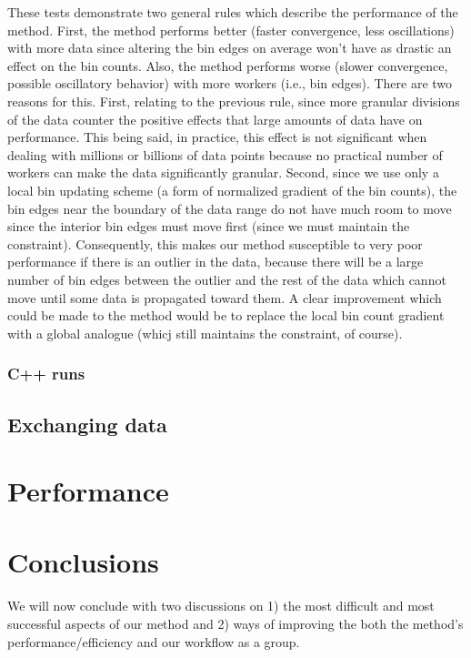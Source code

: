 \documentclass{article}
\begin{document}
These tests demonstrate two general rules which describe the performance of the method. First, the method performs better (faster convergence, less oscillations) with more data since altering the bin edges on average won't have as drastic an effect on the bin counts. Also, the method performs worse (slower convergence, possible oscillatory behavior) with more workers (i.e., bin edges). There are two reasons for this. First, relating to the previous rule, since more granular divisions of the data counter the positive effects that large amounts of data have on performance. This being said, in practice, this effect is not significant when dealing with millions or billions of data points because no practical number of workers can make the data significantly granular. Second, since we use only a local bin updating scheme (a form of normalized gradient of the bin counts), the bin edges near the boundary of the data range do not have much room to move since the interior bin edges must move first (since we must maintain the constraint). Consequently, this makes our method susceptible to very poor performance if there is an outlier in the data, because there will be a large number of bin edges between the outlier and the rest of the data which cannot move until some data is propagated toward them. A clear improvement which could be made to the method would be to replace the local bin count gradient with a global analogue (whicj still maintains the constraint, of course).


\subsubsection{C++ runs}





\subsection{Exchanging data}

\section{Performance}



\section{Conclusions}
We will now conclude with two discussions on 1) the most difficult and most successful aspects of our method and 2) ways of improving the both the method's performance/efficiency and our workflow as a group.
\end{document}
